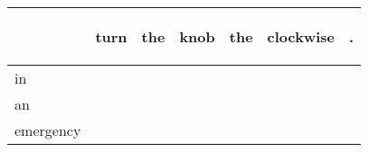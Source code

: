 \documentclass[landscape]{article}
\newcommand{\ssp}{\hspace{2pt}}
\begin{document}
\noindent\begin{tabular}{|l|p{10pt}|p{10pt}|p{10pt}|p{10pt}|p{10pt}|p{10pt}|}
\hline
&\begin{sideways}\cellcolor{ref0}turn\hspace{12pt}\end{sideways}&\begin{sideways}\cellcolor{ref1}the\hspace{12pt}\end{sideways}&\begin{sideways}\cellcolor{ref2}knob\hspace{12pt}\end{sideways}&\begin{sideways}\cellcolor{ref3}the\hspace{12pt}\end{sideways}&\begin{sideways}\cellcolor{ref4}clockwise\hspace{12pt}\end{sideways}&\begin{sideways}\cellcolor{ref5}.\hspace{12pt}\end{sideways}\\
\hline
\ssp in \ssp&\hspace{2pt}&\hspace{2pt}&\hspace{2pt}&\hspace{2pt}&\hspace{2pt}&\hspace{2pt}\\
\hline
\ssp an \ssp&\hspace{2pt}&\hspace{2pt}&\hspace{2pt}&\hspace{2pt}&\hspace{2pt}&\hspace{2pt}\\
\hline
\ssp emergency \ssp&\hspace{2pt}&\hspace{2pt}&\hspace{2pt}&\hspace{2pt}&\hspace{2pt}&\hspace{2pt}\\

\end{tabular}
\end{document}
